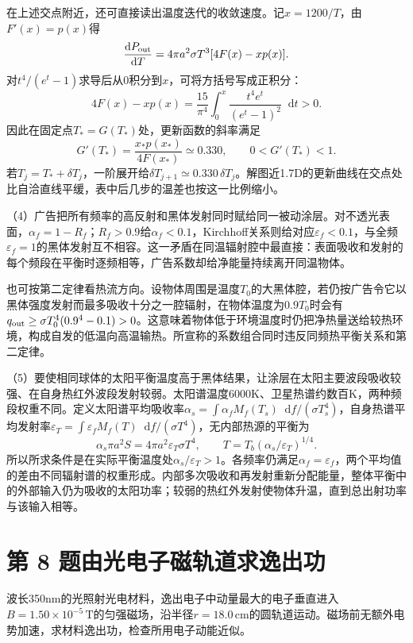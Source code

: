 \documentclass[UTF8,fontset=fandol,a4paper,11pt]{ctexart}
\newcommand{\dd}{\mathop{}\!\mathrm{d}}
\begin{document}
在上述交点附近，还可直接读出温度迭代的收敛速度。记$x=1200/T$，由$F'(x)=p(x)$得
\[
 \frac{\dd P_{\rm out}}{\dd T}
 =4\pi a^2\sigma T^3[4F(x)-xp(x)].
\]
对$t^4/(e^t-1)$求导后从0积分到$x$，可将方括号写成正积分：
\[
 4F(x)-xp(x)=\frac{15}{\pi^4}
 \int_0^x\frac{t^4e^t}{(e^t-1)^2}\dd t>0.
\]
因此在固定点$T_*=G(T_*)$处，更新函数的斜率满足
\[
 G'(T_*)=\frac{x_*p(x_*)}{4F(x_*)}\simeq0.330,
 \qquad 0<G'(T_*)<1.
\]
若$T_j=T_*+\delta T_j$，一阶展开给$\delta T_{j+1}\simeq0.330\,\delta T_j$。解图近1.7D的更新曲线在交点处比自洽直线平缓，表中后几步的温差也按这一比例缩小。

（4）广告把所有频率的高反射和黑体发射同时赋给同一被动涂层。对不透光表面，$\alpha_f=1-R_f$；$R_f>0.9$给$\alpha_f<0.1$，Kirchhoff关系则给对应$\varepsilon_f<0.1$，与全频$\varepsilon_f=1$的黑体发射互不相容。这一矛盾在同温辐射腔中最直接：表面吸收和发射的每个频段在平衡时逐频相等，广告系数却给净能量持续离开同温物体。

也可按第二定律看热流方向。设物体周围是温度$T_0$的大黑体腔，若仍按广告令它以黑体强度发射而最多吸收十分之一腔辐射，在物体温度为$0.9T_0$时会有$q_{\rm out}\ge\sigma T_0^4(0.9^4-0.1)>0$。这意味着物体低于环境温度时仍把净热量送给较热环境，构成自发的低温向高温输热。所宣称的系数组合同时违反同频热平衡关系和第二定律。

（5）要使相同球体的太阳平衡温度高于黑体结果，让涂层在太阳主要波段吸收较强、在自身热红外波段发射较弱。太阳谱温度6000K、卫星热谱约数百K，两种频段权重不同。定义太阳谱平均吸收率$\alpha_s=\int\alpha_fM_f(T_s)\dd f/(\sigma T_s^4)$，自身热谱平均发射率$\varepsilon_T=\int\varepsilon_fM_f(T)\dd f/(\sigma T^4)$，无内部热源的平衡为
\[
\alpha_s\pi a^2S=4\pi a^2\varepsilon_T\sigma T^4,\qquad
T=T_b(\alpha_s/\varepsilon_T)^{1/4}.
\]
所以所求条件是在实际平衡温度处$\alpha_s/\varepsilon_T>1$。各频率仍满足$\alpha_f=\varepsilon_f$，两个平均值的差由不同辐射谱的权重形成。内部多次吸收和再发射重新分配能量，整体平衡中的外部输入仍为吸收的太阳功率；较弱的热红外发射使物体升温，直到总出射功率与该输入相等。




\section*{第 8 题\quad 由光电子磁轨道求逸出功}\label{q:8}

波长350nm的光照射光电材料，逸出电子中动量最大的电子垂直进入$B=1.50\times10^{-5}\,\mathrm T$的匀强磁场，沿半径$r=18.0\,\mathrm{cm}$的圆轨道运动。磁场前无额外电势加速，求材料逸出功，检查所用电子动能近似。
\end{document}
